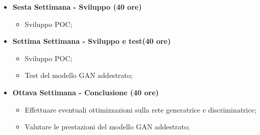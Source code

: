 {\begin{itemize}
\begin{itemize}
                  \item Studio sulle implementazioni della rete discriminatrice (Discriminator) del GAN;
              \end{itemize}
        \item \textbf{Sesta Settimana - Sviluppo (40 ore)}
              \begin{itemize}
                  \item Sviluppo POC;
              \end{itemize}
        \item \textbf{Settima Settimana - Sviluppo e test(40 ore)}
              \begin{itemize}
                  \item Sviluppo POC;
                  \item Test del modello GAN addestrato;
              \end{itemize}
        \item \textbf{Ottava Settimana - Conclusione (40 ore)}
              \begin{itemize}
                  \item Effettuare eventuali ottimizzazioni sulla rete generatrice e discriminatrice;
                  \item Valutare le prestazioni del modello GAN addestrato;
              \end{itemize}
    \end{itemize}
}

\newcommand{\totaleOre}{}

\newcommand{\obiettiviObbligatori}{
    \item \underline{\textit{O01}}: Comprendere il funzionamento teorico dei GAN e le loro applicazioni per la generazione di immagini.;
    \item \underline{\textit{O02}}: Sviluppare la capacità di autogestirsi e affrontare argomenti sull'argomento GAN attraverso l'autoformazione;
    \item \underline{\textit{O03}}: Sviluppo di un POC dimostrativo;

}

\newcommand{\obiettiviDesiderabili}{
    \item \underline{\textit{D01}}: Implementazione di un modello GAN per la generazione di immagini funzionante;
    \item \underline{\textit{D02}}: Generazione di immagini realistiche e coerenti con il dataset di addestramento
    \item \underline{\textit{D03}}: Personalizzare il modello GAN per l'inserimento del brand "Replay" nelle immagini di output
}

\newcommand{\obiettiviFacoltativi}{
    \item \underline{\textit{F01}}: Ottimizzazione del modello GAN
    \item \underline{\textit{F02}}: Valutare le prestazioni del modello GAN
    \item \item \underline{\textit{F03}}: Test applicazione prodotto finale in ambito aziendale
}